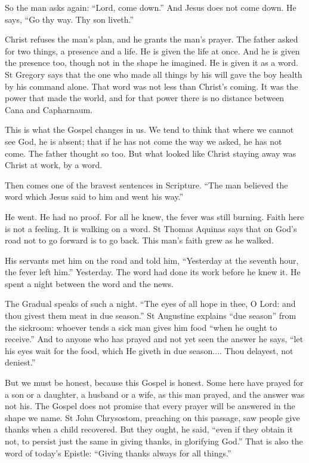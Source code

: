 \medskip

So the man asks again: ``Lord, come down.'' And Jesus does not come down. He
says, ``Go thy way. Thy son liveth.''

Christ refuses the man's plan, and he grants the man's prayer. The father asked
for two things, a presence and a life. He is given the life at once. And he is
given the presence too, though not in the shape he imagined. He is given it as
a word. St Gregory says that the one who made all things by his will gave the
boy health by his command alone. That word was not less than Christ's coming.
It was the power that made the world, and for that power there is no distance
between Cana and Capharnaum.

This is what the Gospel changes in us. We tend to think that where we cannot
see God, he is absent; that if he has not come the way we asked, he has not
come. The father thought so too. But what looked like Christ staying away was
Christ at work, by a word.

\medskip

Then comes one of the bravest sentences in Scripture. ``The man believed the
word which Jesus said to him and went his way.''

He went. He had no proof. For all he knew, the fever was still burning. Faith
here is not a feeling. It is walking on a word. St Thomas Aquinas says that on
God's road not to go forward is to go back. This man's faith grew as he walked.

His servants met him on the road and told him, ``Yesterday at the seventh hour,
the fever left him.'' Yesterday. The word had done its work before he knew it.
He spent a night between the word and the news.

The Gradual speaks of such a night. ``The eyes of all hope in thee, O Lord: and
thou givest them meat in due season.'' St Augustine explains ``due season''
from the sickroom: whoever tends a sick man gives him food ``when he ought to
receive.'' And to anyone who has prayed and not yet seen the answer he says,
``let his eyes wait for the food, which He giveth in due season.... Thou
delayest, not deniest.''

\medskip

But we must be honest, because this Gospel is honest. Some here have prayed for
a son or a daughter, a husband or a wife, as this man prayed, and the answer
was not his. The Gospel does not promise that every prayer will be answered in
the shape we name. St John Chrysostom, preaching on this passage, saw people
give thanks when a child recovered. But they ought, he said, ``even if they
obtain it not, to persist just the same in giving thanks, in glorifying God.''
That is also the word of today's Epistle: ``Giving thanks always for all
things.''

